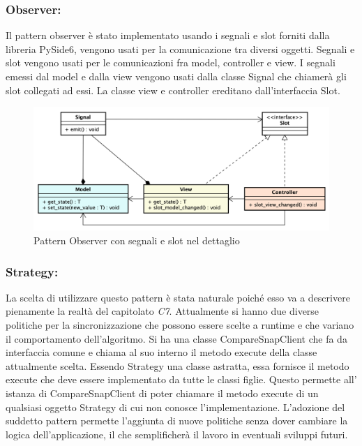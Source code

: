 \subsubsection{Observer:}
Il pattern observer è stato implementato usando i segnali e slot forniti dalla libreria PySide6, vengono usati per la comunicazione tra diversi oggetti.
Segnali e slot vengono usati per le comunicazioni fra model, controller e view. I segnali emessi dal model e dalla view vengono usati dalla classe Signal che chiamerà gli slot collegati ad essi. La classe view e controller ereditano dall'interfaccia Slot.
\begin{figure}[H]
    \centering
    \includegraphics[scale = 0.38]{components/img/observer-implementazione.png}
    \caption{Pattern Observer con segnali e slot nel dettaglio}
    \label{fig:Pattern observer con segnali e slot}
\end{figure}

\subsubsection{Strategy:}
La scelta di utilizzare questo pattern è stata naturale poiché esso va a descrivere pienamente la realtà del capitolato \textit{C7}.\newline{}
Attualmente si hanno due diverse politiche per la sincronizzazione che possono essere scelte a runtime e che variano il comportamento dell'algoritmo. Si ha una classe CompareSnapClient che fa da interfaccia comune e chiama al suo interno il metodo execute della classe attualmente scelta. Essendo Strategy una classe astratta, essa fornisce il metodo execute che deve essere implementato da tutte le classi figlie. Questo permette all' istanza di CompareSnapClient di poter chiamare il metodo execute di un qualsiasi oggetto Strategy di cui non conosce l'implementazione. L'adozione del suddetto pattern permette l'aggiunta di nuove politiche senza dover cambiare la logica dell'applicazione, il che semplificherà il lavoro in eventuali sviluppi futuri.

